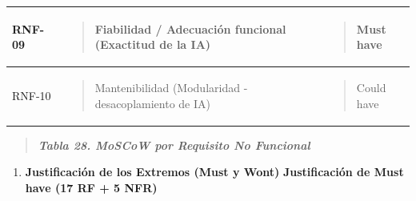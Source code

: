 \documentclass[
]{article}
\newcounter{none} %
\begin{document}
{\def\LTcaptype{none} %
\begin{longtable}[]{@{}
  >{\raggedright\arraybackslash}p{}
  >{\raggedright\arraybackslash}p{}
  >{\raggedright\arraybackslash}p{}@{}}
\toprule\noalign{}
\begin{minipage}[b]{\linewidth}\raggedright
RNF-09
\end{minipage} & \begin{minipage}[b]{\linewidth}\raggedright
\begin{quote}
Fiabilidad / Adecuación funcional (Exactitud de la IA)
\end{quote}
\end{minipage} & \begin{minipage}[b]{\linewidth}\raggedright
\begin{quote}
Must have
\end{quote}
\end{minipage} \\
\midrule\noalign{}
\endhead
\bottomrule\noalign{}
\endlastfoot
RNF-10 & \begin{minipage}[t]{\linewidth}\raggedright
\begin{quote}
Mantenibilidad (Modularidad - desacoplamiento de IA)
\end{quote}
\end{minipage} & \begin{minipage}[t]{\linewidth}\raggedright
\begin{quote}
Could have
\end{quote}
\end{minipage} \\
\end{longtable}
}

\begin{quote}
\protect{}\label{_bookmark106}{}\emph{\textbf{Tabla 28.
MoSCoW por Requisito No Funcional}}
\end{quote}

\begin{enumerate}
\def\labelenumi{\arabic{enumi}.}
\setcounter{enumi}{4}
\item
  \protect{}\label{_bookmark107}{}\textbf{Justificación de
  los Extremos (Must y Won\textquotesingle t)}
  \protect{}\label{_bookmark108}{}\textbf{Justificación de
  Must have (17 RF + 5 NFR)}
\end{enumerate}
\end{document}

